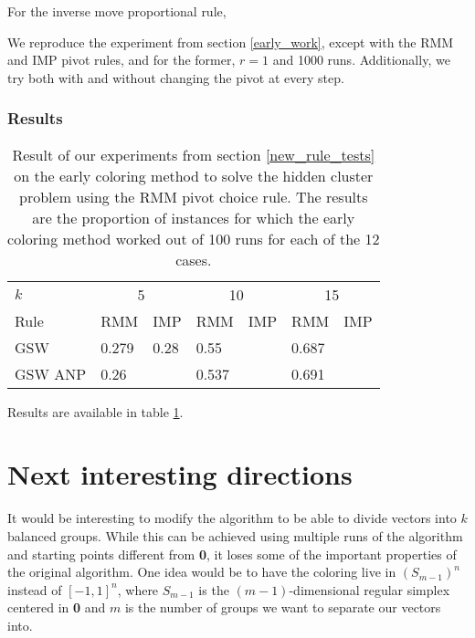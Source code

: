 \documentclass[12pt]{article}
\begin{document}
For the inverse move proportional rule,

We reproduce the experiment from section \ref{early_work}, except with the RMM and IMP pivot rules, and for the former, $r=1$ and 1000 runs. Additionally, we try both with and without changing the pivot at every step.

\subsubsection{Results}
\begin{table}[h!]
\centering
\caption{Result of our experiments from section \ref{new_rule_tests} on the early coloring method to solve the hidden cluster problem using the RMM pivot choice rule. The results are the proportion of instances for which the early coloring method worked out of 100 runs for each of the 12 cases.}
\begin{tabular}{l|ll|ll|ll}
$k$  & \multicolumn{2}{c}{5} & \multicolumn{2}{c}{10} & \multicolumn{2}{c}{15}\\
Rule &RMM&IMP&RMM&IMP&RMM&IMP\\ \hline
GSW  &0.279&0.28&0.55&&0.687&\\
GSW ANP&0.26&&0.537&&0.691&
\end{tabular}
\label{early_coloring_method_exp2}
\end{table}
Results are available in table \ref{early_coloring_method_exp2}.

 


\section{Next interesting directions}
It would be interesting to modify the algorithm to be able to divide vectors into $k$ balanced groups. While this can be achieved using multiple runs of the algorithm and starting points different from \textbf{0}, it loses some of the important properties of the original algorithm. One idea would be to have the coloring live in $(S_{m-1})^n$ instead of $[-1,1]^n$, where $S_{m-1}$ is  the $(m-1)$-dimensional regular simplex centered in \textbf{0} and $m$ is the number of groups we want to separate our vectors into.
\end{document}
